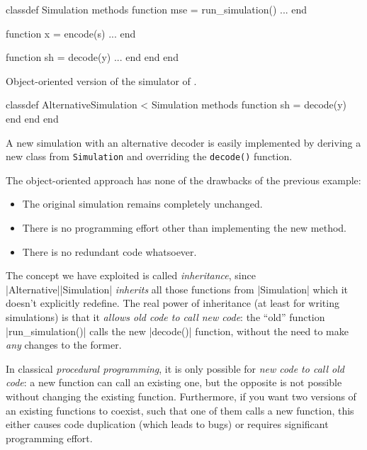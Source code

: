 \begin{listing}
\begin{Code}
  classdef Simulation
    methods
      function mse = run_simulation()
        ... %
      end

      function x = encode(s)
        ...
      end

      function sh = decode(y)
        ...
      end
    end
  end
\end{Code}
  \caption{Object-oriented version of the simulator of .}
  \label{lst:objectsim}
\end{listing}

\begin{listing}
\begin{Code}
  classdef AlternativeSimulation < Simulation
    methods
      function sh = decode(y)
      end
    end 
  end
\end{Code}
  \caption{A new simulation with an alternative decoder is easily implemented by
  deriving a new class from \texttt{Simulation} and overriding the
  \texttt{decode()} function.}
  \label{lst:derivedclass}
\end{listing}

The object-oriented approach has none of the drawbacks of the previous example:
\begin{itemize}
  \item The original simulation remains completely unchanged.
  \item There is no programming effort other than implementing the new method.
  \item There is no redundant code whatsoever.
\end{itemize}

The concept we have exploited is called \emph{inheritance}, since
|Alternative|\-|Simulation| \emph{inherits} all those functions from
|Simulation| which it doesn't explicitly redefine.  The real power of
inheritance (at least for writing
simulations) is that it \emph{allows old code to call new code}: the
``old'' function |run_simulation()| calls the new |decode()| function, without
the need to make \emph{any} changes to the former. 

In classical \emph{procedural programming}, it is only possible for
\emph{new code to call old code}: a new function can call an existing one, but
the opposite is not possible without changing the existing function.
Furthermore, if you want two versions of an existing functions to coexist, such
that one of them calls a new function, this either causes code duplication
(which leads to bugs) or requires significant programming effort. 

